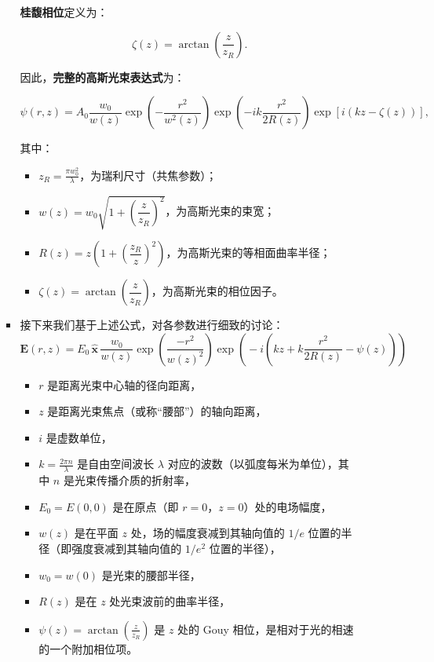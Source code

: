 \begin{enumerate}
\begin{enumerate}
\begin{itemize}
			\textbf{桂馥相位}定义为：
			
			\[
			\zeta(z) = \arctan \left( \dfrac{z}{z_R} \right).
			\]
			
			\begin{ubox}{}
				因此，\textbf{完整的高斯光束表达式}为：
				
				$$
				\psi(r, z) = A_0 \dfrac{w_0}{w(z)} \exp \left( - \dfrac{r^2}{w^2(z)} \right) \exp \left( - i k \dfrac{r^2}{2 R(z)} \right) \exp \left[ i \left( k z - \zeta(z) \right) \right],
				$$
				
				其中：
				\begin{itemize}
					\item $z_R = \frac{\pi w_0^2}{\lambda}$，为瑞利尺寸（共焦参数）；
					\item \(w(z) = w_0 \sqrt{1 + \left( \dfrac{z}{z_R} \right)^2 }\)，为高斯光束的束宽；
					\item \(R(z) = z \left( 1 + \left( \dfrac{z_R}{z} \right)^2 \right)\)，为高斯光束的等相面曲率半径；
					\item \(\zeta(z) = \arctan \left( \dfrac{z}{z_R} \right)\)，为高斯光束的相位因子。
				\end{itemize}
			\end{ubox}
			
			\item 接下来我们基于上述公式，对各参数进行细致的讨论：
			\begin{equation*}
				\mathbf{E}(r,z) = E_0 \, \hat{\mathbf{x}} \, \frac{w_0}{w(z)}\exp \left( \frac{-r^2}{w(z)^2} \right)\exp \left(\! -i \left(kz +k \frac{r^2}{2R(z)} - \psi(z) \right)\!\right)
			\end{equation*}
			
			\begin{itemize}
				\item $r$ 是距离光束中心轴的径向距离，
				\item $z$ 是距离光束焦点（或称“腰部”）的轴向距离，
				\item $i$ 是虚数单位，
				\item $k = \frac{2\pi n}{\lambda}$ 是自由空间波长 $\lambda$ 对应的波数（以弧度每米为单位），其中 $n$ 是光束传播介质的折射率，
				\item $E_0 = E(0, 0)$ 是在原点（即 $r = 0$，$z = 0$）处的电场幅度，
				\item $w(z)$ 是在平面 $z$ 处，场的幅度衰减到其轴向值的 $1/e$ 位置的半径（即强度衰减到其轴向值的 $1/e^2$ 位置的半径），
				\item $w_0 = w(0)$ 是光束的腰部半径，
				\item $R(z)$ 是在 $z$ 处光束波前的曲率半径，
				\item $\psi(z) = \arctan\left(\frac{z}{z_R}\right)$ 是 $z$ 处的 Gouy 相位，是相对于光的相速的一个附加相位项。
			\end{itemize}
			

\end{itemize}
\end{enumerate}
\end{enumerate}
